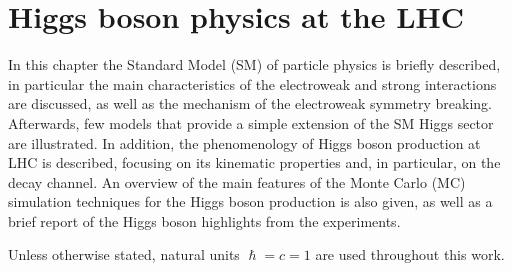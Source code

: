 \chapter{Higgs boson physics at the LHC}\label{chap1}
\thispagestyle{empty}

In this chapter the Standard Model (SM) of particle physics is briefly described, in particular the main characteristics of the electroweak and strong interactions are discussed, as well as the mechanism of the electroweak symmetry breaking. Afterwards, few models that provide a simple extension of the SM Higgs sector are illustrated.
In addition, the phenomenology of Higgs boson production at LHC is described, focusing on its kinematic properties and, in particular, on the \hww decay channel. An overview of the main features of the Monte Carlo (MC) simulation techniques for the Higgs boson production is also given, as well as a brief report of the Higgs boson highlights from the experiments.

\noindent Unless otherwise stated, natural units $\hslash=c=1$ are used throughout this work.


%
%
%




